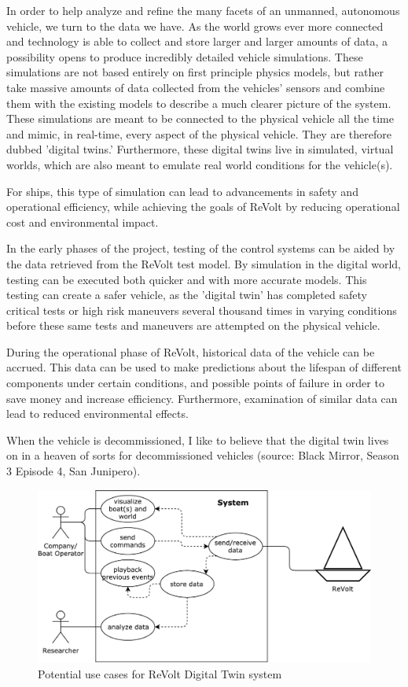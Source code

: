 In order to help analyze and refine the many facets of an unmanned, autonomous vehicle, we turn to the data we have. As the world grows ever more connected and technology is able to collect and store larger and larger amounts of data, a possibility opens to produce incredibly detailed vehicle simulations. These simulations are not based entirely on first principle physics models, but rather take massive amounts of data collected from the vehicles' sensors and combine them with the existing models to describe a much clearer picture of the system. These simulations are meant to be connected to the physical vehicle all the time and mimic, in real-time, every aspect of the physical vehicle. They are therefore dubbed 'digital twins.' Furthermore, these digital twins live in simulated, virtual worlds, which are also meant to emulate real world conditions for the vehicle(s).

For ships, this type of simulation can lead to advancements in safety and operational efficiency, while achieving the goals of ReVolt by reducing operational cost and environmental impact. 

In the early phases of the project, testing of the control systems can be aided by the data retrieved from the ReVolt test model. By simulation in the digital world, testing can be executed both quicker and with more accurate models. This testing can create a safer vehicle, as the 'digital twin' has completed safety critical tests or high risk maneuvers several thousand times in varying conditions before these same tests and maneuvers are attempted on the physical vehicle.

During the operational phase of ReVolt, historical data of the vehicle can be accrued. This data can be used to make predictions about the lifespan of different components under certain conditions, and possible points of failure in order to save money and increase efficiency. Furthermore, examination of similar data can lead to reduced environmental effects.

When the vehicle is decommissioned, I like to believe that the digital twin lives on in a heaven of sorts for decommissioned vehicles (source: Black Mirror, Season 3 Episode 4, San Junipero).

\begin{figure}[H]
\centering
\includegraphics[scale=.6]{Images/Use_Case_Diagram.pdf}
\caption{Potential use cases for ReVolt Digital Twin system}
\label{fig:UseCaseDiagram}
\end{figure}

